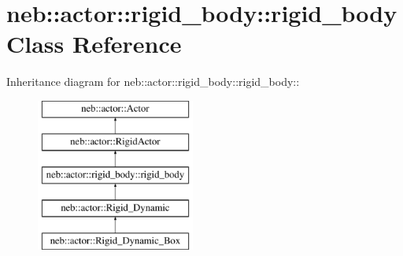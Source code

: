 \hypertarget{classneb_1_1actor_1_1rigid__body_1_1rigid__body}{
\section{neb::actor::rigid\_\-body::rigid\_\-body Class Reference}
\label{classneb_1_1actor_1_1rigid__body_1_1rigid__body}
}
Inheritance diagram for neb::actor::rigid\_\-body::rigid\_\-body::\begin{figure}[H]
\begin{center}
\leavevmode
\includegraphics[height=5cm]{classneb_1_1actor_1_1rigid__body_1_1rigid__body}
\end{center}
\end{figure}
